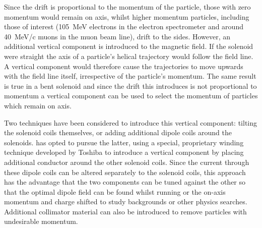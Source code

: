 Since the drift is proportional to the momentum of the particle, those with zero momentum would remain on axis, whilst higher momentum particles, including those of interest (105~MeV electrons in the \phaseII electron spectrometer and around 40~MeV/c muons in the muon beam line), drift to the sides.  
However, an additional vertical component is introduced to the magnetic field.
If the solenoid were straight the axis of a particle's helical trajectory would follow the field line. 
A vertical component would therefore cause the trajectories to move upwards with the field line itself, irrespective of the particle's momentum.
The same result is true in a bent solenoid and since the drift this introduces is not proportional to momentum a vertical component can be used to select the momentum of particles which remain on axis.

Two techniques have been considered to introduce this vertical component: tilting the solenoid coils themselves, or adding additional dipole coils around the solenoids.
\COMET has opted to pursue the latter, using a special, proprietary winding technique developed by Toshiba to introduce a vertical component by placing additional conductor around the other solenoid coils.
Since the current through these dipole coils can be altered separately to the solenoid coils, this approach has the advantage that the two components can be tuned against the other so that the optimal dipole field can be found whilst running or the on-axis momentum and charge shifted to study backgrounds or other physics searches.
Additional collimator material can also be introduced to remove particles with undesirable momentum.

